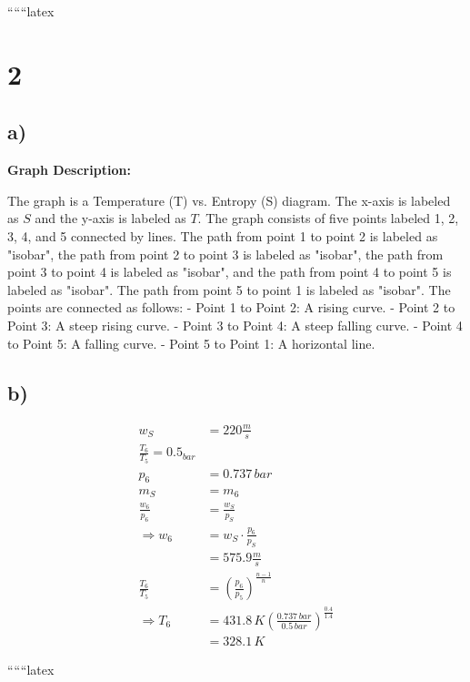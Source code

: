 
``````latex


\section*{2}

\subsection*{a)}

\begin{center}
\textbf{Graph Description:}
\end{center}

The graph is a Temperature (T) vs. Entropy (S) diagram. The x-axis is labeled as $S$ and the y-axis is labeled as $T$. The graph consists of five points labeled 1, 2, 3, 4, and 5 connected by lines. The path from point 1 to point 2 is labeled as "isobar", the path from point 2 to point 3 is labeled as "isobar", the path from point 3 to point 4 is labeled as "isobar", and the path from point 4 to point 5 is labeled as "isobar". The path from point 5 to point 1 is labeled as "isobar". The points are connected as follows:
- Point 1 to Point 2: A rising curve.
- Point 2 to Point 3: A steep rising curve.
- Point 3 to Point 4: A steep falling curve.
- Point 4 to Point 5: A falling curve.
- Point 5 to Point 1: A horizontal line.

\subsection*{b)}

\begin{align*}
w_S &= 220 \frac{m}{s} \\
\frac{T_6}{T_5} = 0.5_{bar} \\
p_6 &= 0.737 \, bar \\
m_S &= m_6 \\
\frac{w_6}{p_6} &= \frac{w_S}{p_S} \\
\Rightarrow w_6 &= w_S \cdot \frac{p_6}{p_S} \\
&= 575.9 \frac{m}{s} \\
\frac{T_6}{T_5} &= \left( \frac{p_6}{p_5} \right)^{\frac{n-1}{n}} \\
\Rightarrow T_6 &= 431.8 \, K \left( \frac{0.737 \, bar}{0.5 \, bar} \right)^{\frac{0.4}{1.4}} \\
&= 328.1 \, K
\end{align*}

``````latex


